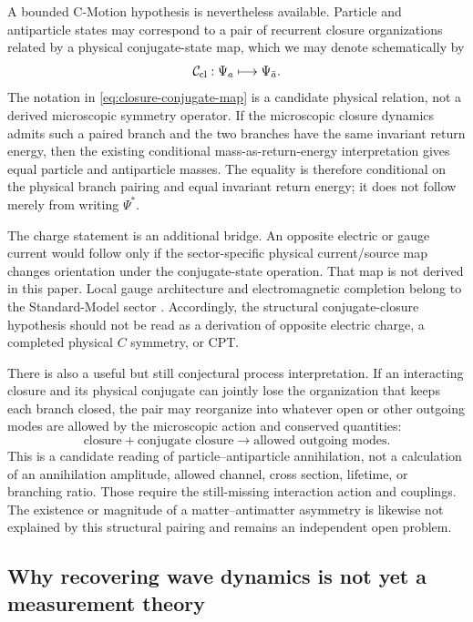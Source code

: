 \documentclass[11pt]{article}
\theoremstyle{definition}
\begin{document}
A bounded C-Motion hypothesis is nevertheless available.  Particle and antiparticle states may
correspond to a pair of recurrent closure organizations related by a physical conjugate-state
map, which we may denote schematically by
\begin{equation}
 \mathcal C_{\rm cl}:\Psi_{a}\longmapsto\Psi_{\bar a}.
 \label{eq:closure-conjugate-map}
\end{equation}
The notation in \eqref{eq:closure-conjugate-map} is a candidate physical relation, not a derived
microscopic symmetry operator.  If the microscopic closure dynamics admits such a paired branch
and the two branches have the same invariant return energy, then the existing conditional
mass-as-return-energy interpretation gives equal particle and antiparticle masses.  The equality
is therefore conditional on the physical branch pairing and equal invariant return energy; it
does not follow merely from writing $\Psi^*$.

The charge statement is an additional bridge.  An opposite electric or gauge current would
follow only if the sector-specific physical current/source map changes orientation under the
conjugate-state operation.  That map is not derived in this paper.  Local gauge architecture and
electromagnetic completion belong to the Standard-Model sector \cite{CmotionSMStructureI2026}.
Accordingly, the structural conjugate-closure hypothesis should not be read as a derivation of
opposite electric charge, a completed physical $C$ symmetry, or CPT.

There is also a useful but still conjectural process interpretation.  If an interacting closure
and its physical conjugate can jointly lose the organization that keeps each branch closed, the
pair may reorganize into whatever open or other outgoing modes are allowed by the microscopic
action and conserved quantities:
\begin{equation}
 \text{closure}+\text{conjugate closure}
 \longrightarrow
 \text{allowed outgoing modes}.
 \label{eq:conjugate-unwinding}
\end{equation}
This is a candidate reading of particle--antiparticle annihilation, not a calculation of an
annihilation amplitude, allowed channel, cross section, lifetime, or branching ratio.  Those
require the still-missing interaction action and couplings.  The existence or magnitude of a
matter--antimatter asymmetry is likewise not explained by this structural pairing and remains an
independent open problem.

\subsection{Why recovering wave dynamics is not yet a measurement theory}
\end{document}
